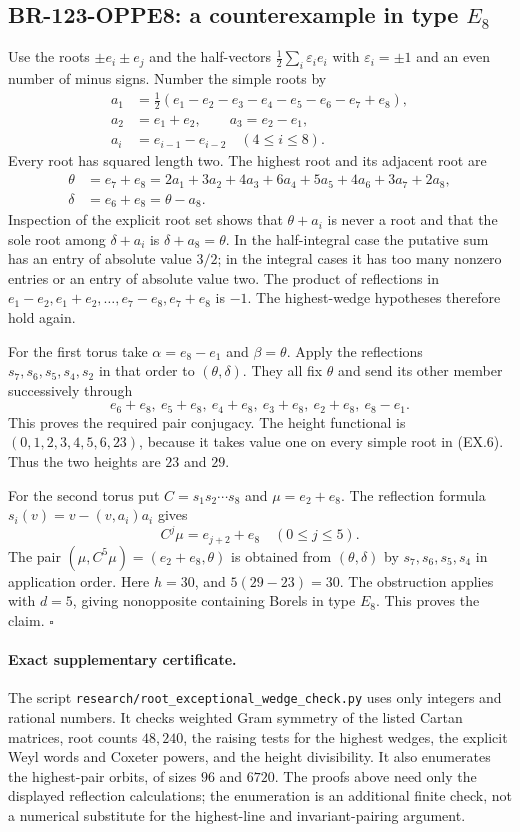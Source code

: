 \documentclass[11pt,a4paper]{article}
\theoremstyle{definition}\newtheorem{definition}[theorem]{Definition}
\theoremstyle{remark}\newtheorem{remark}[theorem]{Remark}
\begin{document}
\subsection{BR-123-OPPE8: a counterexample in type \texorpdfstring{$E_8$}{E8}}
Use the roots $\pm e_i\pm e_j$ and the half-vectors
$\frac12\sum_i\varepsilon_i e_i$ with $\varepsilon_i=\pm1$
and an even number of minus signs.  Number the simple roots by
\[
\begin{split}
 a_1&=\tfrac12(e_1-e_2-e_3-e_4-e_5-e_6-e_7+e_8),\\
 a_2&=e_1+e_2,\qquad a_3=e_2-e_1,\\
 a_i&=e_{i-1}-e_{i-2}\quad(4\leq i\leq8).
\end{split}
 \tag{EX.6}
\]
Every root has squared length two.  The highest root and its
adjacent root are
\[
 \begin{split}
 \theta&=e_7+e_8
       =2a_1+3a_2+4a_3+6a_4+5a_5+4a_6+3a_7+2a_8,\\
 \delta&=e_6+e_8=\theta-a_8.
 \end{split}
\]
Inspection of the explicit root set shows that $\theta+a_i$
is never a root and that the sole root among $\delta+a_i$ is
$\delta+a_8=\theta$.  In the half-integral case the putative
sum has an entry of absolute value $3/2$; in the integral cases
it has too many nonzero entries or an entry of absolute value two.
The product of reflections in
$e_1-e_2,e_1+e_2,\ldots,e_7-e_8,e_7+e_8$ is $-1$.
The highest-wedge hypotheses therefore hold again.

For the first torus take
$\alpha=e_8-e_1$ and $\beta=\theta$.
Apply the reflections $s_7,s_6,s_5,s_4,s_2$ in that order to
$(\theta,\delta)$.  They all fix $\theta$ and send its other
member successively through
\[
 e_6+e_8,\ e_5+e_8,\ e_4+e_8,\ e_3+e_8,
                    \ e_2+e_8,\ e_8-e_1.
\]
This proves the required pair conjugacy.  The height functional
is $(0,1,2,3,4,5,6,23)$, because it takes value one on every
simple root in (EX.6).  Thus the two heights are $23$ and $29$.

For the second torus put $C=s_1s_2\cdots s_8$ and
$\mu=e_2+e_8$.  The reflection formula
$s_i(v)=v-(v,a_i)a_i$ gives
\[
 C^j\mu=e_{j+2}+e_8\quad(0\leq j\leq5).
\]
The pair $(\mu,C^5\mu)=(e_2+e_8,\theta)$ is obtained from
$(\theta,\delta)$ by $s_7,s_6,s_5,s_4$ in application order.
Here $h=30$, and $5(29-23)=30$.  The obstruction applies with
$d=5$, giving nonopposite containing Borels in type $E_8$.
This proves the claim.  $\square$

\paragraph{Exact supplementary certificate.}
The script \texttt{research/root\_exceptional\_wedge\_check.py}
uses only integers and rational numbers.  It checks weighted Gram
symmetry of the listed Cartan matrices, root counts $48,240$, the raising tests for the
highest wedges, the explicit Weyl words and Coxeter powers, and
the height divisibility.  It also enumerates the highest-pair
orbits, of sizes $96$ and $6720$.  The proofs above need only
the displayed reflection calculations; the enumeration is an
additional finite check, not a numerical substitute for the
highest-line and invariant-pairing argument.
\end{document}
